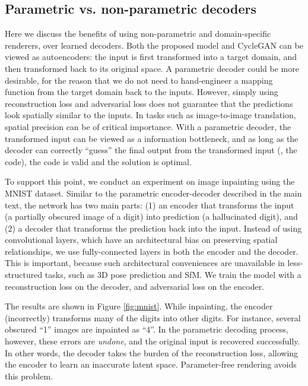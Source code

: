 \documentclass[10pt,twocolumn,letterpaper]{article}
\begin{document}
\clearpage
\appendix
\begin{bibunit}[ieee]
\begin{appendices}

\section{Parametric vs. non-parametric decoders}
Here we discuss the benefits of using non-parametric and domain-specific renderers, over learned decoders.
Both the proposed model and CycleGAN \cite{CycleGAN2017} can be viewed as autoencoders: the input is first transformed 
into a target domain, and then transformed back to its original space.
A parametric decoder could be more desirable, for the reason that we do not need to hand-engineer a mapping function from the target domain back to the inputs.
However, simply using reconstruction loss and adversarial loss does not
guarantee that the predictions look spatially similar to the inputs. In tasks such as image-to-image translation, spatial precision can be of critical importance.
With a parametric decoder, the transformed input can be viewed as a information bottleneck, and as long as the decoder can correctly ``guess'' the final output from the transformed input (\ie, the code), the code is valid and the solution is optimal.

To support this point, we conduct an experiment on image inpainting using the MNIST dataset. 
Similar to the parametric encoder-decoder described in the main text, the network has two main parts:
(1) an encoder that transforms the input (a partially obscured image of a digit) into prediction (a hallucinated digit), 
and (2) a decoder
that transforms the prediction back into the input. 
Instead of using convolutional layers, which have an architectural bias on 
preserving spatial relationships, we use fully-connected layers in both the 
encoder and the decoder. This is important, because such architectural conveniences are unavailable in less-structured tasks, such as 3D pose prediction and SfM. 
We train the model with a reconstruction loss on the decoder, and adversarial loss on the encoder.


The results are shown in Figure \ref{fig:mnist}.
While inpainting, the encoder (incorrectly) transforms many of the digits into other digits. For instance, several obscured ``1'' images are inpainted as ``4''. In the parametric decoding process, however, these errors are \textit{undone}, and the original input is recovered successfully. In other words, the decoder takes the burden of the reconstruction loss, allowing the encoder to learn an inaccurate latent space. Parameter-free rendering avoids this problem.


\end{appendices}
\end{bibunit}
\end{document}
